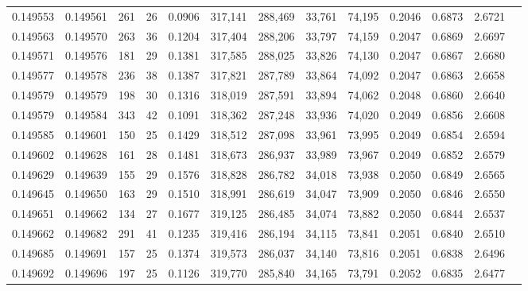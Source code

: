 \begin{tabular}{rrrrrrrrrrrrr}
0.149553 & 0.149561 &   261 &  26 &                                     0.0906 & 317,141 & 288,469 &  33,761 &  74,195 & 0.2046 & 0.6873 & 2.6721 \\
0.149563 & 0.149570 &   263 &  36 &                                     0.1204 & 317,404 & 288,206 &  33,797 &  74,159 & 0.2047 & 0.6869 & 2.6697 \\
0.149571 & 0.149576 &   181 &  29 &                                     0.1381 & 317,585 & 288,025 &  33,826 &  74,130 & 0.2047 & 0.6867 & 2.6680 \\
0.149577 & 0.149578 &   236 &  38 &                                     0.1387 & 317,821 & 287,789 &  33,864 &  74,092 & 0.2047 & 0.6863 & 2.6658 \\
0.149579 & 0.149579 &   198 &  30 &                                     0.1316 & 318,019 & 287,591 &  33,894 &  74,062 & 0.2048 & 0.6860 & 2.6640 \\
0.149579 & 0.149584 &   343 &  42 &                                     0.1091 & 318,362 & 287,248 &  33,936 &  74,020 & 0.2049 & 0.6856 & 2.6608 \\
0.149585 & 0.149601 &   150 &  25 &                                     0.1429 & 318,512 & 287,098 &  33,961 &  73,995 & 0.2049 & 0.6854 & 2.6594 \\
0.149602 & 0.149628 &   161 &  28 &                                     0.1481 & 318,673 & 286,937 &  33,989 &  73,967 & 0.2049 & 0.6852 & 2.6579 \\
0.149629 & 0.149639 &   155 &  29 &                                     0.1576 & 318,828 & 286,782 &  34,018 &  73,938 & 0.2050 & 0.6849 & 2.6565 \\
0.149645 & 0.149650 &   163 &  29 &                                     0.1510 & 318,991 & 286,619 &  34,047 &  73,909 & 0.2050 & 0.6846 & 2.6550 \\
0.149651 & 0.149662 &   134 &  27 &                                     0.1677 & 319,125 & 286,485 &  34,074 &  73,882 & 0.2050 & 0.6844 & 2.6537 \\
0.149662 & 0.149682 &   291 &  41 &                                     0.1235 & 319,416 & 286,194 &  34,115 &  73,841 & 0.2051 & 0.6840 & 2.6510 \\
0.149685 & 0.149691 &   157 &  25 &                                     0.1374 & 319,573 & 286,037 &  34,140 &  73,816 & 0.2051 & 0.6838 & 2.6496 \\
0.149692 & 0.149696 &   197 &  25 &                                     0.1126 & 319,770 & 285,840 &  34,165 &  73,791 & 0.2052 & 0.6835 & 2.6477 \\

\end{tabular}
